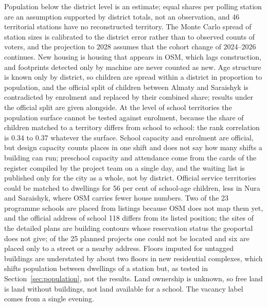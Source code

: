 Population below the district level is an estimate; equal shares per polling station are an assumption supported by district totals, not an observation, and 46 territorial stations have no reconstructed territory. The Monte Carlo spread of station sizes is calibrated to the district error rather than to observed counts of voters, and the projection to 2028 assumes that the cohort change of 2024--2026 continues. New housing is housing that appears in OSM, which lags construction, and footprints detected only by machine are never counted as new. Age structure is known only by district, so children are spread within a district in proportion to population, and the official split of children between Almaty and Saraishyk is contradicted by enrolment and replaced by their combined share; results under the official split are given alongside. At the level of school territories the population surface cannot be tested against enrolment, because the share of children matched to a territory differs from school to school: the rank correlation is 0.34 to 0.37 whatever the surface. School capacity and enrolment are official, but design capacity counts places in one shift and does not say how many shifts a building can run; preschool capacity and attendance come from the cards of the register compiled by the project team on a single day, and the waiting list is published only for the city as a whole, not by district. Official service territories could be matched to dwellings for 56 per cent of school-age children, less in Nura and Saraishyk, where OSM carries fewer house numbers. Two of the 23 programme schools are placed from listings because OSM does not map them yet, and the official address of school 118 differs from its listed position; the sites of the detailed plans are building contours whose reservation status the geoportal does not give; of the 25 planned projects one could not be located and six are placed only to a street or a nearby address. Floors imputed for untagged buildings are understated by about two floors in new residential complexes, which shifts population between dwellings of a station but, as tested in Section~\ref{sec:population}, not the results. Land ownership is unknown, so free land is land without buildings, not land available for a school. The vacancy label comes from a single evening.

